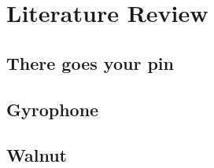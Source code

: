 \chapter{Literature Review}

\section{There goes your pin}
\lipsum[1]
\lipsum[2]
\lipsum[3]

\section{Gyrophone}
\lipsum[4]

\section{Walnut}
\lipsum[4]
